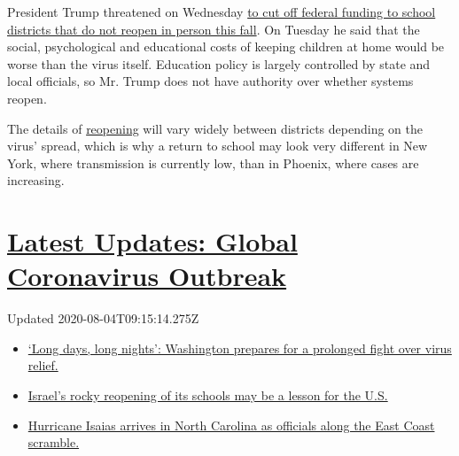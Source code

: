 President Trump threatened on Wednesday
\href{https://www.nytimes.com/2020/07/08/us/politics/trump-schools-reopening.html}{to
cut off federal funding to school districts that do not reopen in person
this fall}. On Tuesday he said that the social, psychological and
educational costs of keeping children at home would be worse than the
virus itself. Education policy is largely controlled by state and local
officials, so Mr. Trump does not have authority over whether systems
reopen.

The details of
\href{https://www.nytimes.com/2020/07/16/upshot/coronavirus-school-reopening-private-public-gap.html}{reopening}
will vary widely between districts depending on the virus' spread, which
is why a return to school may look very different in New York, where
transmission is currently low, than in Phoenix, where cases are
increasing.

\hypertarget{latest-updates-global-coronavirus-outbreak}{%
\section{\texorpdfstring{\href{https://www.nytimes.com/2020/08/04/world/coronavirus-covid-19.html?action=click\&pgtype=Article\&state=default\&region=MAIN_CONTENT_1\&context=storylines_live_updates}{Latest
Updates: Global Coronavirus
Outbreak}}{Latest Updates: Global Coronavirus Outbreak}}\label{latest-updates-global-coronavirus-outbreak}}

Updated 2020-08-04T09:15:14.275Z

\begin{itemize}
\tightlist
\item
  \href{https://www.nytimes.com/2020/08/04/world/coronavirus-covid-19.html?action=click\&pgtype=Article\&state=default\&region=MAIN_CONTENT_1\&context=storylines_live_updates\#link-6b644638}{`Long
  days, long nights': Washington prepares for a prolonged fight over
  virus relief.}
\item
  \href{https://www.nytimes.com/2020/08/04/world/coronavirus-covid-19.html?action=click\&pgtype=Article\&state=default\&region=MAIN_CONTENT_1\&context=storylines_live_updates\#link-7af9fca0}{Israel's
  rocky reopening of its schools may be a lesson for the U.S.}
\item
  \href{https://www.nytimes.com/2020/08/04/world/coronavirus-covid-19.html?action=click\&pgtype=Article\&state=default\&region=MAIN_CONTENT_1\&context=storylines_live_updates\#link-33bf9168}{Hurricane
  Isaias arrives in North Carolina as officials along the East Coast
  scramble.}
\end{itemize}


